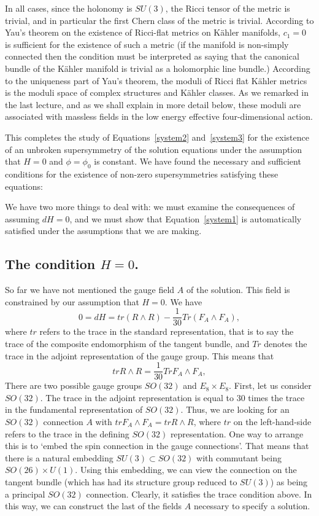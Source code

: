 In all cases, since  the holonomy is $SU(3)$, the Ricci tensor of
the metric is trivial, and in particular the first Chern class of the
metric is trivial. 
According to Yau's theorem on the existence of Ricci-flat metrics on
K\"ahler manifolds, $c_1=0$ is sufficient for the existence of such a
metric  (if the manifold is
non-simply connected then the condition must be interpreted as saying
that the canonical bundle of the K\"ahler manifold is trivial as a
holomorphic line bundle.)
According to the uniqueness part of Yau's theorem, the moduli of Ricci
flat K\"ahler metrics is the moduli space of complex structures and
K\"ahler classes. As we remarked in the last lecture, and as we shall
explain in more detail below, these moduli are associated with
massless fields in the low energy effective four-dimensional action.


This completes the study of Equations~\ref{system2} and~\ref{system3}
for the existence of an unbroken supersymmetry of the solution 
equations under the 
assumption that $H=0$ and $\phi=\phi_0$ is constant. We have
found the necessary and sufficient conditions for the existence of
non-zero supersymmetries satisfying these equations:

\smallskip
{} 
 
We have two more things to deal with: we must examine the consequences
of assuming $dH=0$, and we must show that
Equation~\ref{system1} is automatically satisfied under the
assumptions that we are making.

\subsection{The condition $H=0$.}

So far we have not mentioned the gauge field $A$ of the solution.
This field is constrained by our assumption that $H=0$.
We have
$$0=dH = tr (R\wedge R)-\frac{1}{30} Tr(F_A\wedge F_A),$$
where $tr$ refers to the trace in the standard representation, that is
to say the trace of the composite endomorphism of the tangent bundle,
and $Tr$ denotes the trace in the adjoint representation of the gauge
group. 
This means that
$$tr R\wedge R=\frac{1}{30} Tr F_A\wedge F_A,$$
There are two possible gauge groups $SO(32)$ and
$E_8\times E_8$. 
First, let us consider $SO(32)$. 
The trace in the 
adjoint representation is equal to  $30$ times the trace in the fundamental
representation of $SO(32)$.
Thus, we are looking for an $SO(32)$ connection
$A$ with $tr F_A\wedge F_A=tr R\wedge R$, where $tr$ on the
left-hand-side refers to the trace in the defining $SO(32)$ representation. 
One way to arrange this is to `embed the spin connection in the gauge
connections'.
That means that there is a natural embedding $SU(3)\subset
SO(32)$ with commutant being $SO(26)\times U(1)$.
Using this embedding, we can view the
connection on the  
tangent bundle (which has had its structure group reduced to $SU(3)$)
as being a principal $SO(32)$ connection.
Clearly, it satisfies the trace condition above.
In this way, we can construct the last of the fields $A$ necessary to
specify a solution.


